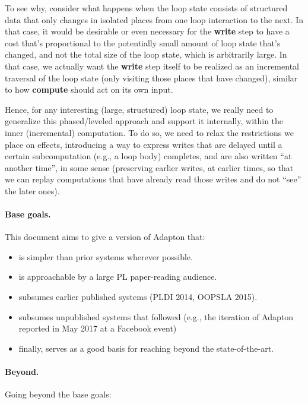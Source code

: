 \documentclass[11pt]{article}
\begin{document}
To see why, consider what happens when the loop state consists of
structured data that only changes in isolated places from one loop
interaction to the next.
%
In that case, it would be desirable or even necessary for the
\textbf{write} step to have a cost that's proportional to the
potentially small amount of loop state that's changed, and not the
total size of the loop state, which is arbitrarily large.
%
In that case, we actually want the \textbf{write} step itself to be
realized as an incremental traversal of the loop state (only visiting
those places that have changed), similar to how \textbf{compute}
should act on its own input.

Hence, for any interesting (large, structured) loop state, we really
need to generalize this phased/leveled approach and support it
internally, within the inner (incremental) computation.
%
To do so, we need to relax the restrictions we place on effects,
introducing a way to express writes that are delayed until a certain
subcomputation (e.g., a loop body) completes, and are also written
``at another time'', in some sense (preserving earlier writes, at
earlier times, so that we can replay computations that have already
read those writes and do not ``see'' the later ones).

\paragraph{Base goals.}
This document aims to give a version of Adapton that:

\begin{itemize}
\item is simpler than prior systems wherever possible.
\item is approachable by a large PL paper-reading audience.
\item subsumes earlier published systems (PLDI 2014, OOPSLA 2015).
\item subsumes unpublished systems that followed (e.g., the iteration of Adapton reported in May 2017 at a Facebook event)
\item finally, serves as a good basis for reaching beyond the state-of-the-art.
\end{itemize}

\paragraph{Beyond.}

Going beyond the base goals:
\end{document}
